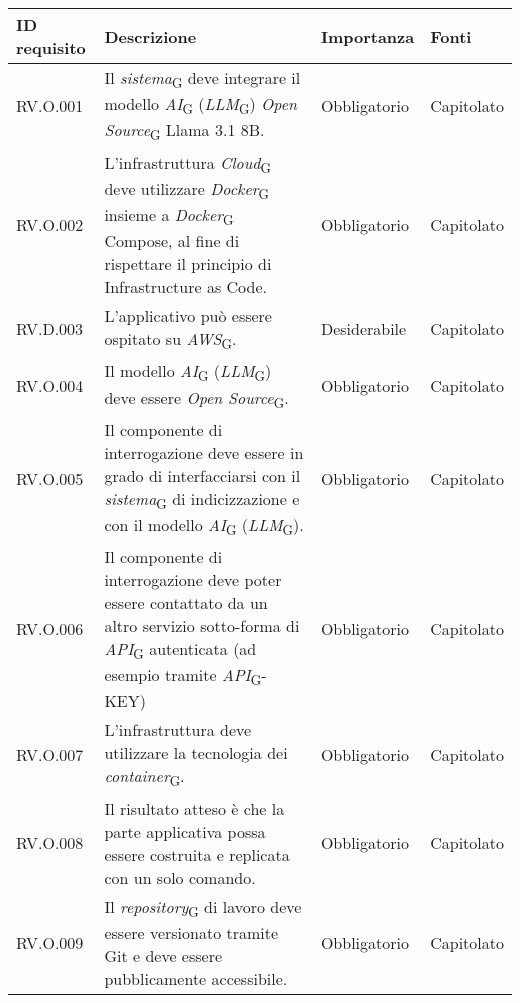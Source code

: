 \begin{table}[H]
\centering
    \begin{tabular}{|C{2.7cm}|L{6.5cm}|C{2.7cm}|C{2.7cm}|}
        \hline
    \textbf{ID requisito} & \textbf{Descrizione} & \textbf{Importanza} & \textbf{Fonti}  \\
    \hline
           RV.O.001 & Il \textit{sistema}\textsubscript{G} deve integrare il modello \textit{AI}\textsubscript{G} (\textit{LLM}\textsubscript{G}) \textit{Open Source}\textsubscript{G} Llama 3.1 8B. & Obbligatorio & Capitolato \\
          \hline 
          RV.O.002 & L’infrastruttura \textit{Cloud}\textsubscript{G} deve utilizzare \textit{Docker}\textsubscript{G} insieme a \textit{Docker}\textsubscript{G} Compose, al fine di rispettare il principio di Infrastructure as Code. & Obbligatorio & Capitolato \\
           \hline
          RV.D.003 & L'applicativo può essere ospitato su \textit{AWS}\textsubscript{G}. & Desiderabile & Capitolato \\
          \hline
          RV.O.004 & Il modello \textit{AI}\textsubscript{G} (\textit{LLM}\textsubscript{G}) deve essere \textit{Open Source}\textsubscript{G}.
         & Obbligatorio & Capitolato \\
        \hline
        RV.O.005 & Il componente di interrogazione deve essere in grado di interfacciarsi con il \textit{sistema}\textsubscript{G} di indicizzazione e con il modello \textit{AI}\textsubscript{G} (\textit{LLM}\textsubscript{G}).
         & Obbligatorio & Capitolato \\
        \hline
        RV.O.006 & Il componente di interrogazione deve poter essere contattato da un altro servizio sotto-forma di \textit{API}\textsubscript{G} autenticata (ad esempio tramite \textit{API}\textsubscript{G}-KEY)
         & Obbligatorio & Capitolato \\
         \hline
        RV.O.007 &  L’infrastruttura deve utilizzare la tecnologia dei \textit{container}\textsubscript{G}.
         & Obbligatorio & Capitolato \\
        \hline
         RV.O.008 & Il risultato atteso è che la parte applicativa possa essere costruita e replicata con un solo comando.
         & Obbligatorio & Capitolato \\
        \hline
        RV.O.009 & Il \textit{repository}\textsubscript{G} di lavoro deve essere versionato tramite Git e deve essere pubblicamente accessibile.
         & Obbligatorio & Capitolato \\

\end{tabular}
\end{table}
